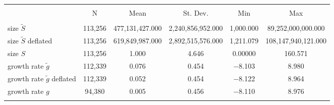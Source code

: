 
\begin{tabular}{@{\extracolsep{5pt}}lccccc} 
\\[-1.8ex]\hline 
\hline \\[-1.8ex] 
 & \multicolumn{1}{c}{N} & \multicolumn{1}{c}{Mean} & \multicolumn{1}{c}{St. Dev.} & \multicolumn{1}{c}{Min} & \multicolumn{1}{c}{Max} \\ 
\hline \\[-1.8ex] 
size $\tilde{S}$ & 113,256 & 477,131,427.000 & 2,240,856,952.000 & 1,000.000 & 89,252,000,000.000 \\ 
size $\tilde{S}$ deflated & 113,256 & 619,849,987.000 & 2,892,515,576.000 & 1,211.079 & 108,147,940,121.000 \\ 
size $S$ & 113,256 & 1.000 & 4.646 & 0.00000 & 160.571 \\ 
growth rate $\tilde{g}$ & 112,339 & 0.076 & 0.454 & $-$8.103 & 8.980 \\ 
growth rate $\tilde{g}$ deflated & 112,339 & 0.052 & 0.454 & $-$8.122 & 8.964 \\ 
growth rate $g$ & 94,380 & 0.005 & 0.456 & $-$8.110 & 8.976 \\ 
\hline \\[-1.8ex] 
\end{tabular} 
